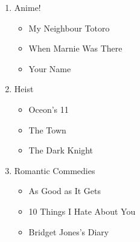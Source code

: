\begin{enumerate}
\item Anime!
\begin{itemize}
\item My Neighbour Totoro
\item When Marnie Was There
\item Your Name
\end{itemize}
\item Heist
\begin{itemize}
\item Oceon's 11
\item The Town
\item The Dark Knight
\end{itemize}
\item Romantic Commedies
\begin{itemize}
\item As Good as It Gets
\item 10 Things I Hate About You
\item Bridget Jones's Diary
\end{itemize}
\end{enumerate}